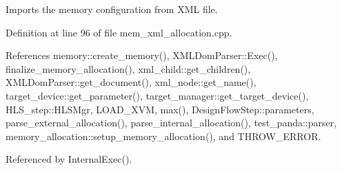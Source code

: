 Imports the memory configuration from X\+ML file. 



Definition at line 96 of file mem\+\_\+xml\+\_\+allocation.\+cpp.



References memory\+::create\+\_\+memory(), X\+M\+L\+Dom\+Parser\+::\+Exec(), finalize\+\_\+memory\+\_\+allocation(), xml\+\_\+child\+::get\+\_\+children(), X\+M\+L\+Dom\+Parser\+::get\+\_\+document(), xml\+\_\+node\+::get\+\_\+name(), target\+\_\+device\+::get\+\_\+parameter(), target\+\_\+manager\+::get\+\_\+target\+\_\+device(), H\+L\+S\+\_\+step\+::\+H\+L\+S\+Mgr, L\+O\+A\+D\+\_\+\+X\+VM, max(), Design\+Flow\+Step\+::parameters, parse\+\_\+external\+\_\+allocation(), parse\+\_\+internal\+\_\+allocation(), test\+\_\+panda\+::parser, memory\+\_\+allocation\+::setup\+\_\+memory\+\_\+allocation(), and T\+H\+R\+O\+W\+\_\+\+E\+R\+R\+OR.



Referenced by Internal\+Exec().

